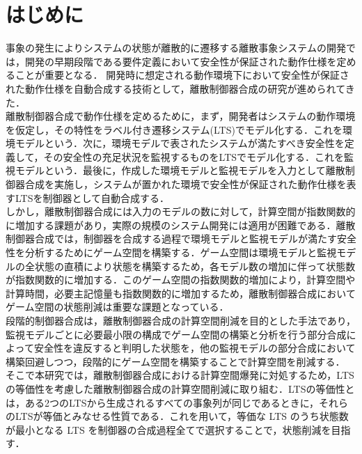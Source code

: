 \documentclass[technicalreport]{ieicej}
\begin{document}
\section{はじめに}
事象の発生によりシステムの状態が離散的に遷移する離散事象システムの開発では，開発の早期段階である要件定義において安全性が保証された動作仕様を定めることが重要となる\cite{rebok}．
開発時に想定される動作環境下において安全性が保証された動作仕様を自動合成する技術として，離散制御器合成\cite{concurrency}の研究が進められてきた．\\
\indent
離散制御器合成で動作仕様を定めるために，まず，開発者はシステムの動作環境を仮定し，その特性をラベル付き遷移システム(LTS)\cite{LTS}でモデル化する．これを環境モデルという．次に，環境モデルで表されたシステムが満たすべき安全性を定義して，その安全性の充足状況を監視するものをLTSでモデル化する．これを監視モデルという．最後に，作成した環境モデルと監視モデルを入力として離散制御器合成を実施し，システムが置かれた環境で安全性が保証された動作仕様を表すLTSを制御器として自動合成する．\\
\indent
しかし，離散制御器合成には入力のモデルの数に対して，計算空間が指数関数的に増加する課題があり，実際の規模のシステム開発には適用が困難である\cite{Thuijsman2020}．離散制御器合成では，制御器を合成する過程で環境モデルと監視モデルが満たす安全性を分析するためにゲーム空間を構築する．ゲーム空間は環境モデルと監視モデルの全状態の直積により状態を構築するため，各モデル数の増加に伴って状態数が指数関数的に増加する．このゲーム空間の指数関数的増加により，計算空間や計算時間，必要主記憶量も指数関数的に増加するため，離散制御器合成においてゲーム空間の状態削減は重要な課題となっている．\\
\indent
段階的制御器合成\cite{yamauchi}は，離散制御器合成の計算空間削減を目的とした手法であり，監視モデルごとに必要最小限の構成でゲーム空間の構築と分析を行う部分合成によって安全性を違反すると判明した状態を，他の監視モデルの部分合成において構築回避しつつ，段階的にゲーム空間を構築することで計算空間を削減する．\\
\indent
そこで本研究では，離散制御器合成における計算空間爆発に対処するため，LTSの等価性を考慮した離散制御器合成の計算空間削減に取り組む．LTSの等価性\cite{bisimulation}とは，ある2つのLTSから生成されるすべての事象列が同じであるときに，それらのLTSが等価とみなせる性質である．これを用いて，等価な LTS のうち状態数が最小となる LTS を制御器の合成過程全てで選択することで，状態削減を目指す．
\end{document}
